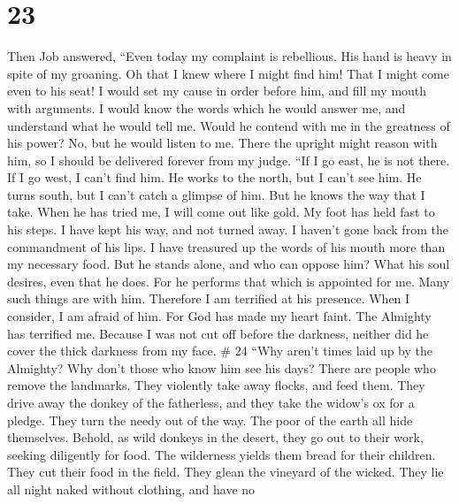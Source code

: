 \hypertarget{section-17}{%
\section{23}\label{section-17}}

 Then Job answered,  ``Even today my
complaint is rebellious. His hand is heavy in spite of my groaning.
 Oh that I knew where I might find him! That I might come
even to his seat!  I would set my cause in order before
him, and fill my mouth with arguments.  I would know the
words which he would answer me, and understand what he would tell me.
 Would he contend with me in the greatness of his power?
No, but he would listen to me.  There the upright might
reason with him, so I should be delivered forever from my judge.
 ``If I go east, he is not there. If I go west, I can't
find him.  He works to the north, but I can't see him. He
turns south, but I can't catch a glimpse of him.  But he
knows the way that I take. When he has tried me, I will come out like
gold.  My foot has held fast to his steps. I have kept
his way, and not turned away.  I haven't gone back from
the commandment of his lips. I have treasured up the words of his mouth
more than my necessary food.  But he stands alone, and
who can oppose him? What his soul desires, even that he does.
 For he performs that which is appointed for me. Many
such things are with him.  Therefore I am terrified at
his presence. When I consider, I am afraid of him.  For
God has made my heart faint. The Almighty has terrified me.
 Because I was not cut off before the darkness, neither
did he cover the thick darkness from my face. \# 24  ``Why
aren't times laid up by the Almighty? Why don't those who know him see
his days?  There are people who remove the landmarks. They
violently take away flocks, and feed them.  They drive
away the donkey of the fatherless, and they take the widow's ox for a
pledge.  They turn the needy out of the way. The poor of
the earth all hide themselves.  Behold, as wild donkeys in
the desert, they go out to their work, seeking diligently for food. The
wilderness yields them bread for their children.  They cut
their food in the field. They glean the vineyard of the wicked.
 They lie all night naked without clothing, and have no
